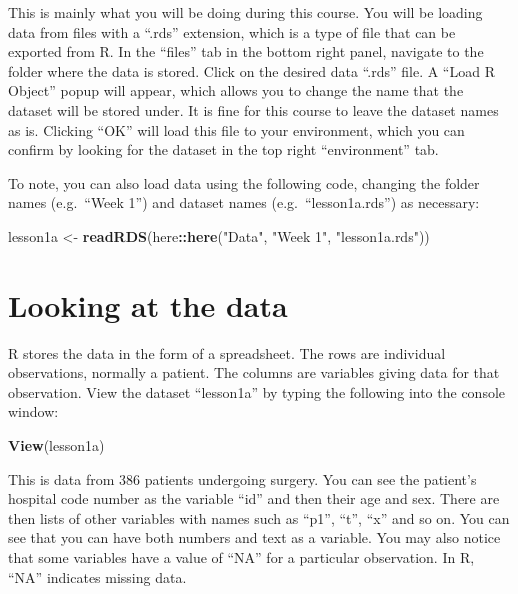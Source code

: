 \documentclass[]{book}
\newenvironment{Shaded}{\begin{snugshade}}{\end{snugshade}}
\newcommand{\KeywordTok}[1]{\textcolor[rgb]{0.13,0.29,0.53}{\textbf{#1}}}
\newcommand{\NormalTok}[1]{#1}
\newcommand{\OperatorTok}[1]{\textcolor[rgb]{0.81,0.36,0.00}{\textbf{#1}}}
\newcommand{\StringTok}[1]{\textcolor[rgb]{0.31,0.60,0.02}{#1}}
\begin{document}
This is mainly what you will be doing during this course. You will be
loading data from files with a ``.rds'' extension, which is a type of
file that can be exported from R. In the ``files'' tab in the bottom
right panel, navigate to the folder where the data is stored. Click on
the desired data ``.rds'' file. A ``Load R Object'' popup will appear,
which allows you to change the name that the dataset will be stored
under. It is fine for this course to leave the dataset names as is.
Clicking ``OK'' will load this file to your environment, which you can
confirm by looking for the dataset in the top right ``environment'' tab.

To note, you can also load data using the following code, changing the
folder names (e.g.~``Week 1'') and dataset names (e.g.~``lesson1a.rds'')
as necessary:

\begin{Shaded}
\begin{Highlighting}[]
\NormalTok{lesson1a <-}\StringTok{ }\KeywordTok{readRDS}\NormalTok{(here}\OperatorTok{::}\KeywordTok{here}\NormalTok{(}\StringTok{"Data"}\NormalTok{, }\StringTok{"Week 1"}\NormalTok{, }\StringTok{"lesson1a.rds"}\NormalTok{))}
\end{Highlighting}
\end{Shaded}

\hypertarget{looking-at-the-data-1}{%
\section{Looking at the data}\label{looking-at-the-data-1}}

R stores the data in the form of a spreadsheet. The rows are individual
observations, normally a patient. The columns are variables giving data
for that observation. View the dataset ``lesson1a'' by typing the
following into the console window:

\begin{Shaded}
\begin{Highlighting}[]
\KeywordTok{View}\NormalTok{(lesson1a)}
\end{Highlighting}
\end{Shaded}

This is data from 386 patients undergoing surgery. You can see the
patient's hospital code number as the variable ``id'' and then their age
and sex. There are then lists of other variables with names such as
``p1'', ``t'', ``x'' and so on. You can see that you can have both
numbers and text as a variable. You may also notice that some variables
have a value of ``NA'' for a particular observation. In R, ``NA''
indicates missing data.
\end{document}
